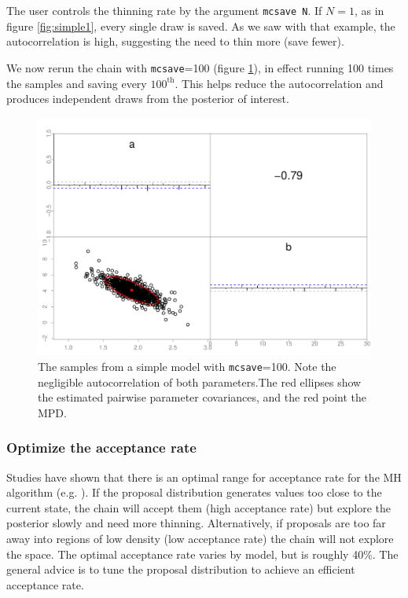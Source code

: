 \documentclass{article}\usepackage[]{graphicx}\usepackage[]{color}
\begin{document}
The user controls the thinning rate by the argument
\texttt{mcsave N}. If $N=1$, as in figure \ref{fig:simple1},
every single draw is saved. As we saw with that example, the
autocorrelation is high, suggesting the need to thin more
(save fewer).

We now rerun the chain with \texttt{mcsave}=100 (figure
\ref{fig:simple2}), in effect running 100 times the samples
and saving every $100^{\text{th}}$. This helps reduce the
autocorrelation and produces independent draws from the
posterior of interest.
\begin{figure}[h]
  \centering
  \includegraphics[width=5in]{../plots/simple2.pdf}
  \caption{The samples from a simple model with
    \texttt{mcsave}=100. Note the negligible autocorrelation
    of both parameters.The red ellipses show the estimated
    pairwise parameter covariances, and the red point the
    MPD.}
  \label{fig:simple2}
\end{figure}


\subsubsection{Optimize the acceptance rate}
Studies have shown that there is an optimal range for
acceptance rate for the MH algorithm
(e.g. \cite{roberts2001}). If the proposal distribution
generates values too close to the current state, the chain
will accept them (high acceptance rate) but explore the
posterior slowly and need more thinning. Alternatively, if
proposals are too far away into regions of low density (low
acceptance rate) the chain will not explore the space. The
optimal acceptance rate varies by model, but is roughly
40\%. The general advice is to tune the proposal
distribution to achieve an efficient acceptance rate.
\end{document}
